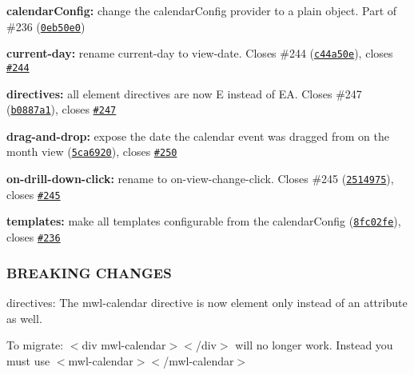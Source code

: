 \begin{DoxyItemize}
\item {\bfseries calendar\+Config\+:} change the calendar\+Config provider to a plain object. Part of \#236 (\href{https://github.com/mattlewis92/angular-bootstrap-calendar/commit/0eb50e0}{\tt 0eb50e0})
\item {\bfseries current-\/day\+:} rename current-\/day to view-\/date. Closes \#244 (\href{https://github.com/mattlewis92/angular-bootstrap-calendar/commit/c44a50e}{\tt c44a50e}), closes \href{https://github.com/mattlewis92/angular-bootstrap-calendar/issues/244}{\tt \#244}
\item {\bfseries directives\+:} all element directives are now E instead of EA. Closes \#247 (\href{https://github.com/mattlewis92/angular-bootstrap-calendar/commit/b0887a1}{\tt b0887a1}), closes \href{https://github.com/mattlewis92/angular-bootstrap-calendar/issues/247}{\tt \#247}
\item {\bfseries drag-\/and-\/drop\+:} expose the date the calendar event was dragged from on the month view (\href{https://github.com/mattlewis92/angular-bootstrap-calendar/commit/5ca6920}{\tt 5ca6920}), closes \href{https://github.com/mattlewis92/angular-bootstrap-calendar/issues/250}{\tt \#250}
\item {\bfseries on-\/drill-\/down-\/click\+:} rename to on-\/view-\/change-\/click. Closes \#245 (\href{https://github.com/mattlewis92/angular-bootstrap-calendar/commit/2514975}{\tt 2514975}), closes \href{https://github.com/mattlewis92/angular-bootstrap-calendar/issues/245}{\tt \#245}
\item {\bfseries templates\+:} make all templates configurable from the calendar\+Config (\href{https://github.com/mattlewis92/angular-bootstrap-calendar/commit/8fc02fe}{\tt 8fc02fe}), closes \href{https://github.com/mattlewis92/angular-bootstrap-calendar/issues/236}{\tt \#236}
\end{DoxyItemize}

\subsubsection*{B\+R\+E\+A\+K\+I\+NG C\+H\+A\+N\+G\+ES}


\begin{DoxyItemize}
\item directives\+: The mwl-\/calendar directive is now element only instead of an attribute as well.
\end{DoxyItemize}

To migrate\+: {\ttfamily $<$div mwl-\/calendar$>$$<$/div$>$} will no longer work. Instead you must use {\ttfamily $<$mwl-\/calendar$>$$<$/mwl-\/calendar$>$}


